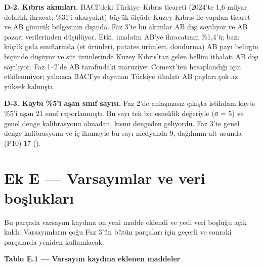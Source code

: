 \textbf{D-2. Kıbrıs akımları.} BACI'deki Türkiye--Kıbrıs ticareti (2024'te 1,6 milyar dolarlık ihracat; \%31'i akaryakıt) büyük ölçüde Kuzey Kıbrıs ile yapılan ticaret ve AB gümrük bölgesinin dışında. Faz 3'te bu akımlar AB dışı sayılıyor ve AB pazarı verilerinden düşülüyor. Etki, imalatın AB'ye ihracatının \%1,4'ü; bazı küçük gıda sınıflarında (et ürünleri, patates ürünleri, dondurma) AB payı belirgin biçimde düşüyor ve süt ürünlerinde Kuzey Kıbrıs'tan gelen hellim ithalatı AB dışı sayılıyor. Faz 1--2'de AB tarafındaki maruziyet Comext'ten hesaplandığı için etkilenmiyor; yalnızca BACI'ye dayanan Türkiye ithalatı AB payları çok az yüksek kalmıştı.

\textbf{D-3. Kaybı \%5'i aşan sınıf sayısı.} Faz 2'de anlaşmasız çıkışta istihdam kaybı \%5'i aşan 21 sınıf raporlanmıştı. Bu sayı tek bir esneklik değeriyle (σ = 5) ve genel denge kalibrasyonu olmadan, kısmi dengeden geliyordu. Faz 3'te genel denge kalibrasyonu ve iç ikameyle bu sayı medyanda 9, dağılımın alt ucunda (P10) 17 ().

\hypertarget{nace_kartlar_10-12-ek-e--varsayux131mlar-ve-veri-boux15fluklarux131}{%
\section{Ek E --- Varsayımlar ve veri boşlukları}\label{nace_kartlar_10-12-ek-e--varsayux131mlar-ve-veri-boux15fluklarux131}}

Bu parçada varsayım kaydına on yeni madde eklendi ve yedi veri boşluğu açık kaldı. Varsayımların çoğu Faz 3'ün bütün parçaları için geçerli ve sonraki parçalarda yeniden kullanılacak.


\textbf{Tablo E.1 --- Varsayım kaydına eklenen maddeler}

\nopagebreak[4]

\begingroup\gbtablo\small

